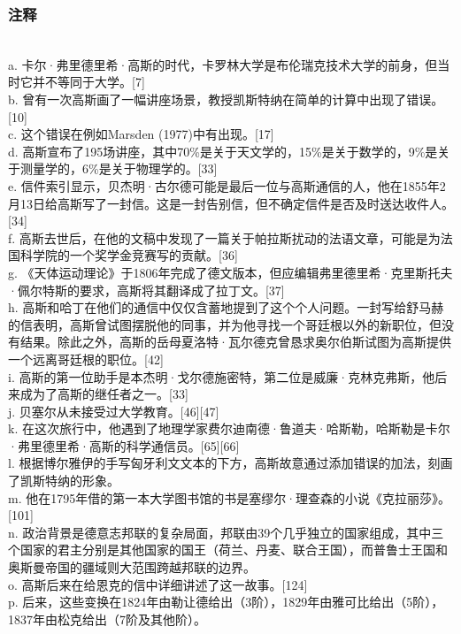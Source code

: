 \subsubsection{注释}\\  
a. 卡尔·弗里德里希·高斯的时代，卡罗林大学是布伦瑞克技术大学的前身，但当时它并不等同于大学。[7] \\
b. 曾有一次高斯画了一幅讲座场景，教授凯斯特纳在简单的计算中出现了错误。[10]\\  
c. 这个错误在例如Marsden (1977)中有出现。[17]\\  
d. 高斯宣布了195场讲座，其中70\%是关于天文学的，15\%是关于数学的，9\%是关于测量学的，6\%是关于物理学的。[33]\\  
e. 信件索引显示，贝杰明·古尔德可能是最后一位与高斯通信的人，他在1855年2月13日给高斯写了一封信。这是一封告别信，但不确定信件是否及时送达收件人。[34]\\  
f. 高斯去世后，在他的文稿中发现了一篇关于帕拉斯扰动的法语文章，可能是为法国科学院的一个奖学金竞赛写的贡献。[36]\\  
g. 《天体运动理论》于1806年完成了德文版本，但应编辑弗里德里希·克里斯托夫·佩尔特斯的要求，高斯将其翻译成了拉丁文。[37]\\  
h. 高斯和哈丁在他们的通信中仅仅含蓄地提到了这个个人问题。一封写给舒马赫的信表明，高斯曾试图摆脱他的同事，并为他寻找一个哥廷根以外的新职位，但没有结果。除此之外，高斯的岳母夏洛特·瓦尔德克曾恳求奥尔伯斯试图为高斯提供一个远离哥廷根的职位。[42]\\  
i. 高斯的第一位助手是本杰明·戈尔德施密特，第二位是威廉·克林克弗斯，他后来成为了高斯的继任者之一。[33]\\  
j. 贝塞尔从未接受过大学教育。[46][47]\\  
k. 在这次旅行中，他遇到了地理学家费尔迪南德·鲁道夫·哈斯勒，哈斯勒是卡尔·弗里德里希·高斯的科学通信员。[65][66]\\  
l. 根据博尔雅伊的手写匈牙利文文本的下方，高斯故意通过添加错误的加法，刻画了凯斯特纳的形象。\\  
m. 他在1795年借的第一本大学图书馆的书是塞缪尔·理查森的小说《克拉丽莎》。[101]\\  
n. 政治背景是德意志邦联的复杂局面，邦联由39个几乎独立的国家组成，其中三个国家的君主分别是其他国家的国王（荷兰、丹麦、联合王国），而普鲁士王国和奥斯曼帝国的疆域则大范围跨越邦联的边界。\\  
o. 高斯后来在给恩克的信中详细讲述了这一故事。[124]\\  
p. 后来，这些变换在1824年由勒让德给出（3阶），1829年由雅可比给出（5阶），1837年由松克给出（7阶及其他阶）。\\  
